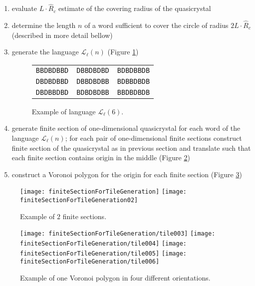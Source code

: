\documentclass[text.tex]{subfiles}
\begin{document}
\begin{enumerate}
\item evaluate $L\cdot\hat{R}_c$ estimate of the covering radius of the quasicrystal
\item determine the length $n$ of a word sufficient to cover the circle of radius $2L\cdot\hat{R}_c$ (described in more detail bellow)
\item generate the language $\mathcal{L}_{\ell}(n)$ (Figure \ref{fig:languageExample})

\begin{figure}[h!]
\begin{tabular}{ccc}
\texttt{BBDBDBBD} & \texttt{DBBDBDBD} & \texttt{BDBDBBDB} \\
\texttt{DBDBDBBD} & \texttt{DBBDBDBB} & \texttt{BDBBDBDB} \\
\texttt{DBDBBDBD} & \texttt{BDBDBDBB} & \texttt{BBDBDBDB} \\
\end{tabular}
\caption{Example of language $\mathcal{L}_\ell(6)$. }
\label{fig:languageExample}
\end{figure}
\item generate finite section of one-dimensional quasicrystal for each word of the language $\mathcal{L}_\ell(n)$; for each pair of one-dimensional finite sections construct finite section of the quasicrystal as in previous section and translate such that each finite section contains origin in the middle (Figure \ref{fig:finiteSectionForTileGeneration})
\item construct a Voronoi polygon for the origin for each finite section (Figure \ref{fig:finiteSectionForTileGeneration:more})
\end{enumerate}

\begin{figure}[h!]
\centering
\texttt{[image: finiteSectionForTileGeneration]}
\texttt{[image: finiteSectionForTileGeneration02]}
\caption{Example of $2$ finite sections.}
\label{fig:finiteSectionForTileGeneration}
\end{figure}

\begin{figure}[h!]
\centering
\texttt{[image: finiteSectionForTileGeneration/tile003]}
\texttt{[image: finiteSectionForTileGeneration/tile004]}
\texttt{[image: finiteSectionForTileGeneration/tile005]}
\texttt{[image: finiteSectionForTileGeneration/tile006]}
\caption{Example of one Voronoi polygon in four different orientations.}
\label{fig:finiteSectionForTileGeneration:more}
\end{figure}
\end{document}
